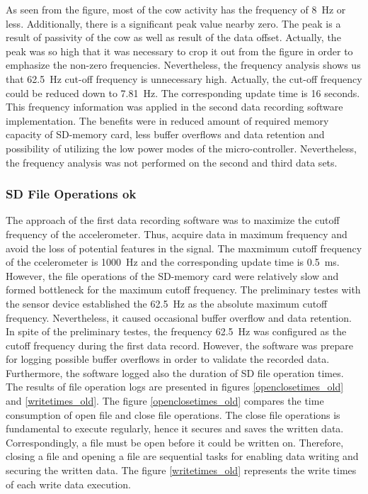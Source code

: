 \documentclass[english,12pt,a4paper,pdftex,elec,utf8]{aaltothesis}
\begin{document}
As seen from the figure, most of the cow activity has the frequency of \SI{8}{\hertz} or less. Additionally, there is a significant peak value nearby zero. The peak is a result of passivity of the cow as well as result of the data offset. Actually, the peak was so high that it was necessary to crop it out from the figure in order to emphasize the non-zero frequencies. Nevertheless, the frequency analysis shows us that \SI{62.5}{\hertz} cut-off frequency is unnecessary high. Actually, the cut-off frequency could be reduced down to \SI{7.81}{\hertz}. The corresponding update time is 16 seconds. This frequency information was applied in the second data recording software implementation. The benefits were in reduced amount of required memory capacity of SD-memory card, less buffer overflows and data retention and possibility of utilizing the low power modes of the micro-controller. Nevertheless, the frequency analysis was not performed on the second and third data sets.



\subsubsection{SD File Operations ok}

The approach of the first data recording software was to maximize the cutoff frequency of the accelerometer. Thus, acquire data in maximum frequency and avoid the loss of potential features in the signal. The maxmimum  cutoff frequency of the ccelerometer is \SI{1000}{\hertz} and the corresponding update time is \SI{0.5}{\milli \second}. However, the file operations of the SD-memory card were relatively slow and formed bottleneck for the maximum cutoff frequency. The preliminary testes with the sensor device established the \SI{62.5}{\hertz} as the absolute maximum cutoff frequency. Nevertheless, it caused occasional buffer overflow and data retention. In spite of the preliminary testes, the frequency \SI{62.5}{\hertz} was configured as the cutoff frequency during the first data record. However, the software was prepare for logging possible buffer overflows in order to validate the recorded data. Furthermore, the software logged also the duration of SD file operation times. The results of file operation logs are presented in figures \ref{openclosetimes_old} and \ref{writetimes_old}. The figure \ref{openclosetimes_old} compares the time consumption of open file and close file operations. The close file operations is fundamental  to execute regularly, hence it secures and saves the written data. Correspondingly, a file must be open before it could be written on. Therefore, closing a file and opening a file are sequential tasks for enabling data writing and securing the written data. The figure \ref{writetimes_old} represents the write times of each write data execution.
\end{document}
